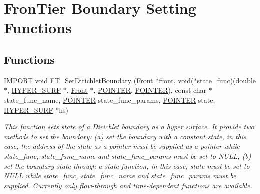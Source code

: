 \hypertarget{group___b_o_u_n_d_a_r_y}{}\section{Fron\+Tier Boundary Setting Functions}
\label{group___b_o_u_n_d_a_r_y}
\subsection*{Functions}
\begin{DoxyCompactItemize}
\item 
\hyperlink{cdecs_8h_a773175d74e73776d69c3e538f17de1ee}{I\+M\+P\+O\+RT} void \hyperlink{group___b_o_u_n_d_a_r_y_ga04f16e2a6047664dfea1d69701676476}{F\+T\+\_\+\+Set\+Dirichlet\+Boundary} (\hyperlink{fdecs_8h_ac32202b798f848095c489cfd04c4ca5f}{Front} $\ast$front, void($\ast$state\+\_\+func)(double $\ast$, \hyperlink{int_8h_acef50fa4757ce0d3f75c97fab5a175bc}{H\+Y\+P\+E\+R\+\_\+\+S\+U\+RF} $\ast$, \hyperlink{fdecs_8h_ac32202b798f848095c489cfd04c4ca5f}{Front} $\ast$, \hyperlink{cdecs_8h_ae51a81000f343b8ec43bca1f6a723d7b}{P\+O\+I\+N\+T\+ER}, \hyperlink{cdecs_8h_ae51a81000f343b8ec43bca1f6a723d7b}{P\+O\+I\+N\+T\+ER}), const char $\ast$state\+\_\+func\+\_\+name, \hyperlink{cdecs_8h_ae51a81000f343b8ec43bca1f6a723d7b}{P\+O\+I\+N\+T\+ER} state\+\_\+func\+\_\+params, \hyperlink{cdecs_8h_ae51a81000f343b8ec43bca1f6a723d7b}{P\+O\+I\+N\+T\+ER} state, \hyperlink{int_8h_acef50fa4757ce0d3f75c97fab5a175bc}{H\+Y\+P\+E\+R\+\_\+\+S\+U\+RF} $\ast$hs)
\begin{DoxyCompactList}\small\item\em This function sets state of a Dirichlet boundary as a hyper surface. It provide two methods to set the boundary\+: (a) set the boundary with a constant state, in this case, the address of the state as a pointer must be supplied as a pointer while state\+\_\+func, state\+\_\+func\+\_\+name and state\+\_\+func\+\_\+params must be set to N\+U\+LL; (b) set the boundary state through a state function, in this case, state must be set to N\+U\+LL while state\+\_\+func, state\+\_\+func\+\_\+name and state\+\_\+func\+\_\+params must be supplied. Currently only flow-\/through and time-\/dependent functions are available. \end{DoxyCompactList}\item 

\end{DoxyCompactItemize}
